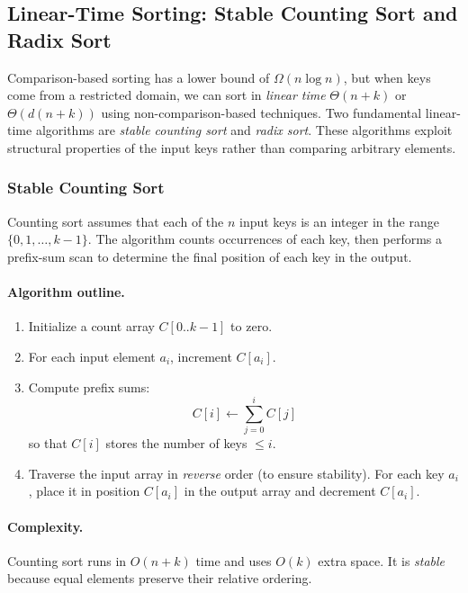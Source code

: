 \documentclass[9pt]{extarticle}
\begin{document}
\subsection{Linear-Time Sorting: Stable Counting Sort and Radix Sort}

Comparison-based sorting has a lower bound of $\Omega(n \log n)$, but when keys
come from a restricted domain, we can sort in \emph{linear time}
$\Theta(n + k)$ or $\Theta(d(n + k))$ using non-comparison-based techniques.
Two fundamental linear-time algorithms are \emph{stable counting sort} and 
\emph{radix sort}.  
These algorithms exploit structural properties of the input keys rather than
comparing arbitrary elements.

\subsubsection{Stable Counting Sort}

Counting sort assumes that each of the $n$ input keys is an integer in the
range $\{0,1,\dots,k-1\}$.  
The algorithm counts occurrences of each key, then performs a prefix-sum scan
to determine the final position of each key in the output.

\paragraph{Algorithm outline.}
\begin{enumerate}
    \item Initialize a count array $C[0..k-1]$ to zero.
    \item For each input element $a_i$, increment $C[a_i]$.
    \item Compute prefix sums: 
          \[
              C[i] \leftarrow \sum_{j=0}^{i} C[j]
          \]
          so that $C[i]$ stores the number of keys $\le i$.
    \item Traverse the input array in \emph{reverse} order (to ensure stability).  
          For each key $a_i$, place it in position $C[a_i]$ in the output array and
          decrement $C[a_i]$.
\end{enumerate}

\paragraph{Complexity.}
Counting sort runs in $O(n+k)$ time and uses $O(k)$ extra space.  
It is \emph{stable} because equal elements preserve their relative ordering.
\end{document}
